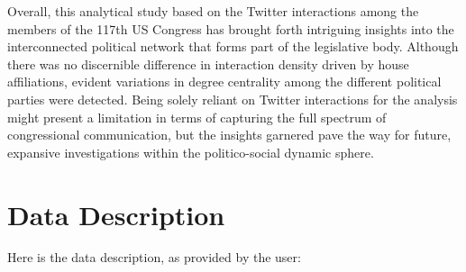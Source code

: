 \documentclass[11pt]{article}
\begin{document}
Overall, this analytical study based on the Twitter interactions among the members of the 117th US Congress has brought forth intriguing insights into the interconnected political network that forms part of the legislative body. Although there was no discernible difference in interaction density driven by house affiliations, evident variations in degree centrality among the different political parties were detected. Being solely reliant on Twitter interactions for the analysis might present a limitation in terms of capturing the full spectrum of congressional communication, but the insights garnered pave the way for future, expansive investigations within the politico-social dynamic sphere.


\clearpage
\appendix

\section{Data Description} \label{sec:data_description} Here is the data description, as provided by the user:
\end{document}
